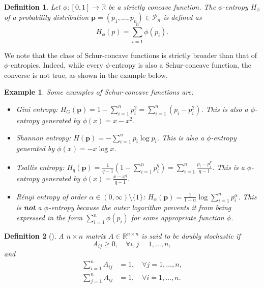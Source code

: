 \documentclass[pdflatex,sn-basic,iicol]{sn-jnl}%
\theoremstyle{thmstyleone}%
\theoremstyle{thmstyletwo}%
\newtheorem{example}{Example}%
\theoremstyle{thmstylethree}%
\newtheorem{definition}{Definition}%
\newcommand{\cP}{\mathcal{P}}
\newcommand{\bp}{\mathbf{p}}
\begin{document}
\begin{definition}\label{def:phi_entropy}
    Let $\phi:[0,1]\to\mathbb{R}$ be a strictly concave function. The $\phi$-entropy $H_\phi$ of a probability distribution $\bp=(p_1,\dots,p_n)\in\cP_n$ is defined as
    \begin{equation}
        H_\phi(p) = \sum_{i=1}^n \phi(p_i).
    \end{equation}
\end{definition}
We note that the class of Schur-concave functions is strictly broader than that of $\phi$-entropies. Indeed, while every $\phi$-entropy is also a Schur-concave function, the converse is not true, as shown in the example below.
\begin{example}
   Some examples of Schur-concave functions are:
    \begin{itemize}
        \item Gini entropy: $H_G(\bp) = 1-\sum_{i=1}^n p^2_i=\sum_{i=1}^n (p_i-p_i^2)$. This is also a $\phi$-entropy generated by $\phi(x)=x-x^2$.
        \item Shannon entropy: $H(\bp) = -\sum_{i=1}^n p_i\log p_i$. This is also a $\phi$-entropy generated by $\phi(x)=-x\log x$. 
        \item Tsallis entropy: $H_q(\bp) = \frac{1}{q-1}(1-\sum_{i=1}^n p^q_i)=\sum_{i=1}^n\frac{p_i-p_i^q}{q-1}$. This is a $\phi$-entropy generated by $\phi(x)=\frac{x-x^q}{q-1}$.
        \item R\'enyi entropy of order $\alpha\in(0,\infty)\setminus\{1\}$: $H_\alpha(\bp) = \frac{1}{1-\alpha}\log\sum_{i=1}^n p^\alpha_i$. This is \textbf{not} a $\phi$-entropy because the outer logarithm prevents it from being expressed in the form $\sum_{i=1}^n \phi(p_i)$ for some appropriate function $\phi$.
    \end{itemize}
\end{example}

\begin{definition}[\cite{marshall1979inequalities}]
A $n\times n$ matrix $A\in\mathbb{R}^{n\times n}$ is said to be \textit{doubly stochastic} if 
\begin{equation}
    {A}_{ij} \geq 0,\quad\forall i,j=1,\dots,n,
\end{equation}
and 
\begin{align}
        \sum_{i=1}^n {A}_{ij} &= 1, \quad\forall j=1,\dots,n,\\
        \sum_{j=1}^n {A}_{ij} &= 1,\quad\forall i=1,\dots,n.
\end{align}

\end{definition}
\end{document}
